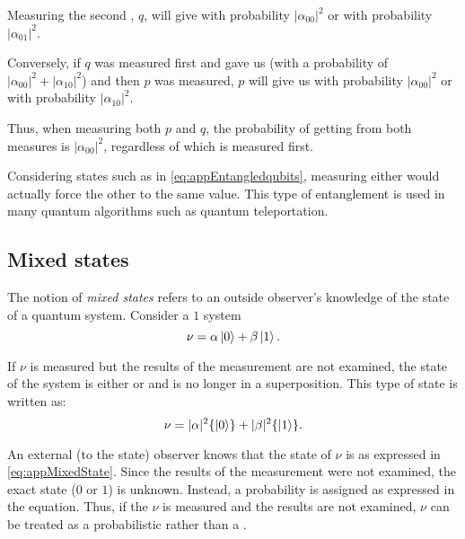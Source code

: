 Measuring the second \qubit{}, $q$, will give  with
probability $|\alpha_{00}|^2$ or 
with probability $|\alpha_{01}|^2$.

Conversely, if  $q$ was measured first and gave us 
(with a probability of $|\alpha_{00}|^2 + |\alpha_{10}|^2$)
and then $p$ was measured, $p$ will give us  with probability
$|\alpha_{00}|^2$ or  with probability $|\alpha_{10}|^2$.

Thus, when measuring both $p$ and $q$, the probability of getting 
from both measures is $|\alpha_{00}|^2$, regardless of which \qubit{}
is measured first.

Considering states such as in \ref{eq:appEntangledqubits},
measuring either \qubit{} would actually force the other \qubit{} to the
same value. This type of entanglement is used in
many quantum algorithms such as
quantum teleportation.
\subsection{Mixed states}\label{sec:appMixedStates}
The notion of \emph{mixed states} refers to an outside observer's knowledge of
the state of a quantum system. Consider a $1$ \qubit{} system
\begin{equation}
\nu = \alpha\left\vert{0}\right\rangle + \beta\left\vert{1}\right\rangle.\label{eq:appOnequbitSystem}
\end{equation}

If $\nu$ is measured but the results of the measurement are not examined,
 the state of the system is either  or
 and is no longer in a superposition. This type of state
is written as:
\begin{equation}
\nu = |\alpha|^2\{\left\vert{0}\right\rangle\} + |\beta|^2\{\left\vert{1}\right\rangle\}.\label{eq:appMixedState}
\end{equation}

An external (to the state) observer knows that the state
of $\nu$ is as expressed in
\vref{eq:appMixedState}. Since the results of the measurement
were not examined, the exact state ($0$ or $1$) is unknown.
Instead, a probability is assigned  as expressed in the equation.
Thus, if the \qubit{} $\nu$ is measured and the results are not
examined, $\nu$ can be treated as a probabilistic \bit{} rather
than a  \qubit.
